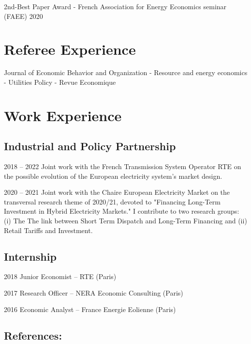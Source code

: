 \documentclass[letterpaper]{article}
\renewenvironment{itemize}{
  \begin{list}{}{
    \setlength{\leftmargin}{1.5em}
  }
}{
  \end{list}
}
\begin{document}
2nd-Best Paper Award - French Association for Energy Economics seminar (FAEE) \hfill \hfill 2020


\section*{\textbf{Referee Experience}} Journal of Economic Behavior and Organization - Resource and energy economics - Utilities Policy - Revue Economique

\section*{\textbf{Work Experience}}

\subsection*{Industrial and Policy Partnership}

\begin{itemize}
    \item 2018 – 2022 Joint work with the French Transmission System Operator
RTE on the possible evolution of the European electricity system's market design.

\item 2020 – 2021 Joint work with the Chaire European Electricity Market on the transversal research theme of 2020/21, devoted to "Financing Long-Term Investment in Hybrid Electricity Markets." I contribute to two research groups: (i) The
The link between Short Term Dispatch and Long-Term Financing and
(ii) Retail Tariffs and Investment.
\end{itemize}


\subsection*{Internship
}
\begin{itemize}
    \item 2018 Junior Economist – RTE (Paris)
    \item 2017 Research Officer – NERA Economic Consulting (Paris)
    \item 2016 Economic Analyst – France Energie Eolienne (Paris)
 \end{itemize}



\subsection*{References:}
\end{document}
